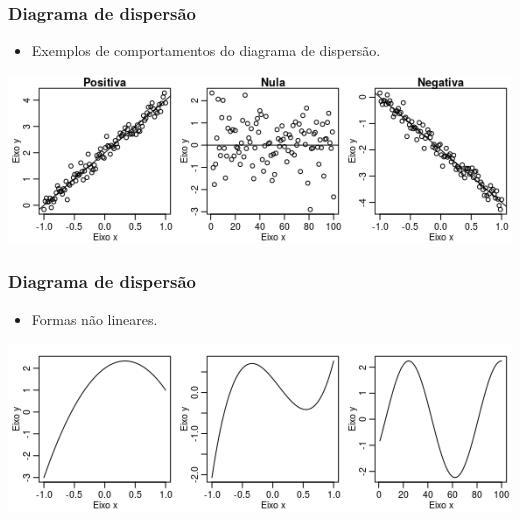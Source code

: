 \documentclass[11pt]{beamer}
\begin{document}
\begin{frame}
\frametitle{Diagrama de dispersão}

\begin{itemize}
\item
  Exemplos de comportamentos do diagrama de dispersão.
\end{itemize}

\begin{center}\includegraphics[width=1\linewidth]{figs/multi_dispersao} \end{center}
\end{frame}

\begin{frame}
\frametitle{Diagrama de dispersão}

\begin{itemize}
\item
  Formas não lineares.
\end{itemize}

\begin{center}\includegraphics[width=1\linewidth]{figs/multi_lines} \end{center}
\end{frame}
\end{document}
